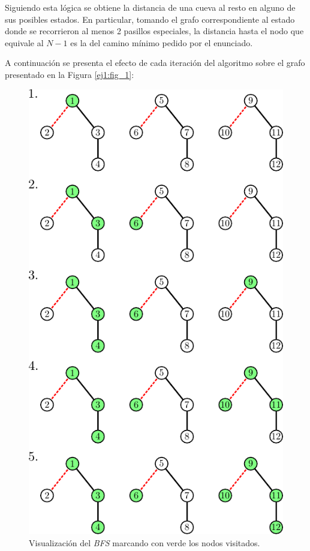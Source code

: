 	Siguiendo esta lógica se obtiene la distancia de una cueva al resto en
	alguno de sus posibles estados. En particular, tomando el grafo
	correspondiente al estado donde se recorrieron al menos 2 pasillos
	especiales, la distancia hasta el nodo que equivale al $N - 1$ es la del camino mínimo
	pedido por el enunciado.

	A continuación se presenta el efecto de cada iteración del algoritmo sobre el grafo
	presentado en la Figura \ref{ej1:fig_1}:

	\begin{figure}[H]
		\centering
		\includegraphics{imagenes/ej1_modelo_2.pdf}
		\caption{Visualización del \emph{BFS} marcando con verde los nodos
		visitados.}
		\label{ej1:bfs}
	\end{figure}

